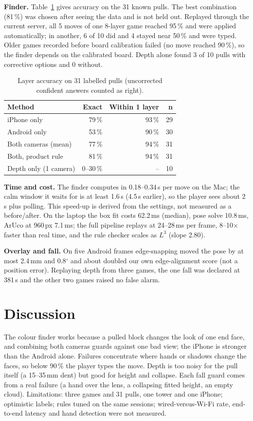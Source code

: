 \documentclass[12pt,a4paper]{article}
\begin{document}
\textbf{Finder.} Table~\ref{tab:find} gives accuracy on the 31 known pulls. The best combination (81\,\%) was chosen after seeing the data and is not held out. Replayed through the current server, all 5 moves of one 8-layer game reached 95\,\% and were applied automatically; in another, 6 of 10 did and 4 stayed near 50\,\% and were typed. Older games recorded before board calibration failed (no move reached 90\,\%), so the finder depends on the calibrated board. Depth alone found 3 of 10 pulls with corrective options and 0 without.
\begin{table}[h]
\centering\small\singlespacing
\caption{Layer accuracy on 31 labelled pulls (uncorrected confident answers counted as right).}\label{tab:find}
\begin{tabular}{@{}lrrr@{}}
\toprule
Method & Exact & Within 1 layer & n \\
\midrule
iPhone only & 79\,\% & 93\,\% & 29 \\
Android only & 53\,\% & 90\,\% & 30 \\
Both cameras (mean) & 77\,\% & 94\,\% & 31 \\
Both, product rule & 81\,\% & 94\,\% & 31 \\
Depth only (1 camera) & 0--30\,\% & -- & 10 \\
\bottomrule
\end{tabular}
\end{table}

\textbf{Time and cost.} The finder computes in 0.18--0.34\,s per move on the Mac; the calm window it waits for is at least 1.6\,s (4.5\,s earlier), so the player sees about 2\,s plus polling. This speed-up is derived from the settings, not measured as a before/after. On the laptop the box fit costs 62.2\,ms (median), pose solve 10.8\,ms, ArUco at 960\,px 7.1\,ms; the full pipeline replays at 24--28\,ms per frame, 8--10$\times$ faster than real time, and the rule checker scales as $L^3$ (slope 2.80).

\textbf{Overlay and fall.} On five Android frames edge-snapping moved the pose by at most 2.4\,mm and 0.8$^\circ$ and about doubled our own edge-alignment score (not a position error). Replaying depth from three games, the one fall was declared at 381\,s and the other two games raised no false alarm.

\section{Discussion}
The colour finder works because a pulled block changes the look of one end face, and combining both cameras guards against one bad view; the iPhone is stronger than the Android alone. Failures concentrate where hands or shadows change the faces, so below 90\,\% the player types the move. Depth is too noisy for the pull itself (a 15--35\,mm dent) but good for height and collapse. Each fall guard comes from a real failure (a hand over the lens, a collapsing fitted height, an empty cloud). Limitations: three games and 31 pulls, one tower and one iPhone; optimistic labels; rules tuned on the same sessions; wired-versus-Wi-Fi rate, end-to-end latency and hand detection were not measured.
\end{document}
